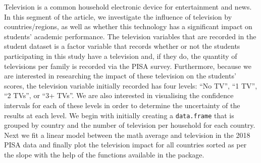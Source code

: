 Television is a common household electronic device for entertainment and
news. In this segment of the article, we investigate the influence of
television by countries/regions, as well as whether this technology has
a significant impact on students' academic performance. The television
variables that are recorded in the student dataset is a factor variable
that records whether or not the students participating in this study
have a television and, if they do, the quantity of televisions per
family is recorded via the PISA survey. Furthermore, because we are
interested in researching the impact of these television on the
students' scores, the television variable initially recorded has four
levels: ``No TV'', ``1 TV'', ``2 TVs'', or ``3+ TVs''. We are also
interested in visualising the confidence intervals for each of these
levels in order to determine the uncertainty of the results at each
level. We begin with initially creating a \texttt{data.frame} that is
grouped by country and the number of television per household for each
country. Next we fit a linear model between the math average and
television in the 2018 PISA data and finally plot the television impact
for all countries sorted as per the slope with the help of the functions
available in the  \citep{ggplot2} package.

